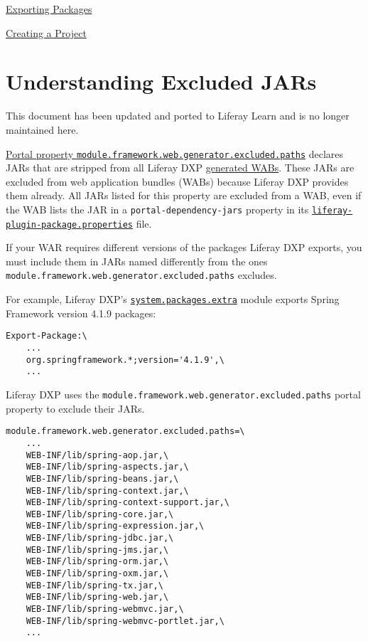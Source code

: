 \href{/docs/7-2/customization/-/knowledge_base/c/exporting-packages}{Exporting
Packages}

\href{/docs/7-2/reference/-/knowledge_base/r/creating-a-project}{Creating
a Project}

\chapter{Understanding Excluded JARs}\label{understanding-excluded-jars}

{ This document has been updated and ported to Liferay Learn and is no
longer maintained here.}

\href{https://docs.liferay.com/dxp/portal/7.2-latest/propertiesdoc/portal.properties.html\#Module\%20Framework}{Portal
property \texttt{module.framework.web.generator.excluded.paths}}
declares JARs that are stripped from all Liferay DXP
\href{/docs/7-2/customization/-/knowledge_base/c/deploying-wars-wab-generator}{generated
WABs}. These JARs are excluded from web application bundles (WABs)
because Liferay DXP provides them already. All JARs listed for this
property are excluded from a WAB, even if the WAB lists the JAR in a
\texttt{portal-dependency-jars} property in its
\href{https://docs.liferay.com/dxp/portal/7.2-latest/propertiesdoc/liferay-plugin-package_7_2_0.properties.html}{\texttt{liferay-plugin-package.properties}}
file.

If your WAR requires different versions of the packages Liferay DXP
exports, you must include them in JARs named differently from the ones
\texttt{module.framework.web.generator.excluded.paths} excludes.

For example, Liferay DXP's
\href{https://github.com/liferay/liferay-portal/blob/7.2.x/modules/core/portal-bootstrap/system.packages.extra.bnd}{\texttt{system.packages.extra}}
module exports Spring Framework version 4.1.9 packages:

\begin{verbatim}
Export-Package:\
    ...
    org.springframework.*;version='4.1.9',\
    ...
\end{verbatim}

Liferay DXP uses the
\texttt{module.framework.web.generator.excluded.paths} portal property
to exclude their JARs.

\begin{verbatim}
module.framework.web.generator.excluded.paths=\
    ...
    WEB-INF/lib/spring-aop.jar,\
    WEB-INF/lib/spring-aspects.jar,\
    WEB-INF/lib/spring-beans.jar,\
    WEB-INF/lib/spring-context.jar,\
    WEB-INF/lib/spring-context-support.jar,\
    WEB-INF/lib/spring-core.jar,\
    WEB-INF/lib/spring-expression.jar,\
    WEB-INF/lib/spring-jdbc.jar,\
    WEB-INF/lib/spring-jms.jar,\
    WEB-INF/lib/spring-orm.jar,\
    WEB-INF/lib/spring-oxm.jar,\
    WEB-INF/lib/spring-tx.jar,\
    WEB-INF/lib/spring-web.jar,\
    WEB-INF/lib/spring-webmvc.jar,\
    WEB-INF/lib/spring-webmvc-portlet.jar,\
    ...
\end{verbatim}

